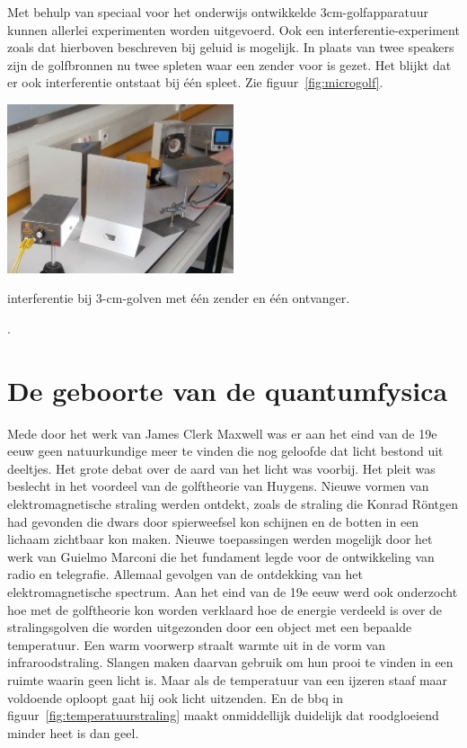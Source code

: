 \documentclass[../main.tex]{subfiles}
\begin{document}
Met behulp van speciaal voor het onderwijs ontwikkelde 3cm-golfapparatuur kunnen allerlei experimenten worden uitgevoerd. Ook een interferentie-experiment zoals dat hierboven beschreven bij geluid is mogelijk. In plaats van twee speakers zijn de golfbronnen nu twee spleten waar een zender voor is gezet. 
Het blijkt dat er ook interferentie ontstaat bij \'e\'en spleet. Zie figuur~\ref{fig:microgolf}.

\begin{center}
\leavevmode
\includegraphics[width=0.5\textwidth]{./img/microgolf.png}
\end{center}

\begin{experiment}{}
interferentie bij 3-cm-golven met \'e\'en zender en \'e\'en ontvanger.
\end{experiment}
.


\section{De geboorte van de quantumfysica}
Mede door het werk van James Clerk Maxwell was er aan het eind van de 19e eeuw geen natuurkundige meer te vinden die nog geloofde dat licht bestond uit deeltjes. Het grote debat over de aard van het licht was voorbij. Het pleit was beslecht in het voordeel van de golftheorie van Huygens. Nieuwe vormen van elektromagnetische straling werden ontdekt, zoals de straling die Konrad R\"ontgen had gevonden die dwars door spierweefsel kon schijnen en de botten in een lichaam zichtbaar kon maken. Nieuwe toepassingen werden mogelijk door het werk van Guielmo Marconi die het fundament legde voor de ontwikkeling van radio en telegrafie. Allemaal gevolgen van de ontdekking van het elektromagnetische spectrum. Aan het eind van de 19e eeuw werd ook onderzocht hoe met de golftheorie kon worden verklaard hoe de energie verdeeld is over de stralingsgolven die worden uitgezonden door een object met een bepaalde temperatuur. Een warm voorwerp straalt warmte uit in de vorm van infraroodstraling. Slangen maken daarvan gebruik om hun prooi te vinden in een ruimte waarin geen licht is. Maar als de temperatuur van een ijzeren staaf maar voldoende oploopt gaat hij ook licht uitzenden. En de bbq in figuur~\ref{fig:temperatuurstraling} maakt onmiddellijk duidelijk dat roodgloeiend minder heet is dan geel.
\end{document}
